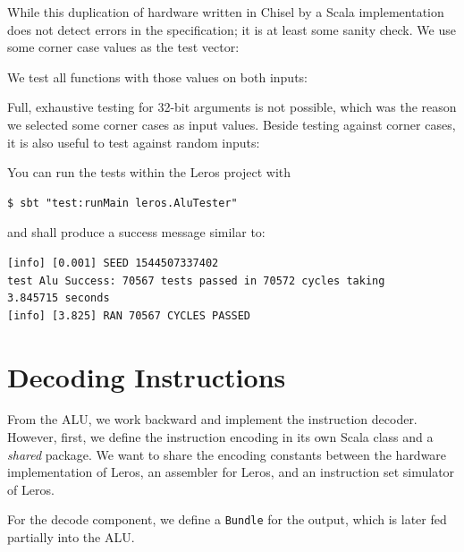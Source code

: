 \documentclass[%
    10pt,
    headinclude, footexclude,
    openright, %
    notitlepage,
    cleardoubleempty,
    headsepline,
    pointlessnumbers,
    bibtotoc, idxtotoc,
    ]{scrbook}
\newcommand{\code}[1]{{\small{\texttt{#1}}}}
\newcommand{\todo}[1]{{\emph{TODO: #1}}}
\renewcommand{\todo}[1]{}
\begin{document}

\noindent While this duplication of hardware written in Chisel by a Scala implementation does not
detect errors in the specification; it is at least some sanity check.
We use some corner case values as the test vector:


\noindent We test all functions with those values on both inputs:


\noindent Full, exhaustive testing for 32-bit arguments is not possible, which was the reason we
selected some corner cases as input values. Beside testing against corner cases, it is also useful
to test against random inputs:


\noindent You can run the tests within the Leros project with

\begin{verbatim}
$ sbt "test:runMain leros.AluTester"
\end{verbatim}

and shall produce a success message similar to:

\begin{verbatim}
[info] [0.001] SEED 1544507337402
test Alu Success: 70567 tests passed in 70572 cycles taking
3.845715 seconds
[info] [3.825] RAN 70567 CYCLES PASSED
\end{verbatim}

\section{Decoding Instructions}


From the ALU, we work backward and implement the instruction decoder.
However, first, we define the instruction encoding in its own Scala class and
a \emph{shared} package. We want to share the encoding constants between
the hardware implementation of Leros, an assembler for Leros, and an instruction
set simulator of Leros.


\todo{Update code when Leros is more complete, as stuff is missing.}

\noindent For the decode component, we define a \code{Bundle} for the output,
which is later fed partially into the ALU.
\end{document}
